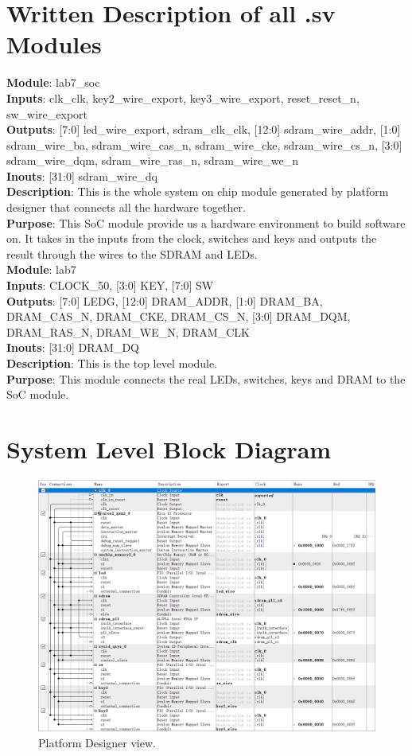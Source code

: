 \documentclass[12pt]{article}
\begin{document}
\section{Written Description of all .sv Modules}
\textbf{Module}: lab7\_soc \\ 
\textbf{Inputs}: clk\_clk, key2\_wire\_export, key3\_wire\_export, reset\_reset\_n, sw\_wire\_export \\ 
\textbf{Outputs}: [7:0] led\_wire\_export, sdram\_clk\_clk, [12:0] sdram\_wire\_addr, [1:0] sdram\_wire\_ba, sdram\_wire\_cas\_n, sdram\_wire\_cke, sdram\_wire\_cs\_n, [3:0] sdram\_wire\_dqm, sdram\_wire\_ras\_n, sdram\_wire\_we\_n \\ 
\textbf{Inouts}: [31:0] sdram\_wire\_dq \\
\textbf{Description}: This is the whole system on chip module generated by platform designer that connects all the hardware together. \\ 
\textbf{Purpose}: This SoC module provide us a hardware environment to build software on. It takes in the inputs from the clock, switches and keys and outputs the result through the wires to the SDRAM and LEDs. \\

\textbf{Module}: lab7 \\ 
\textbf{Inputs}: CLOCK\_50, [3:0] KEY, [7:0] SW \\ 
\textbf{Outputs}: [7:0] LEDG, [12:0] DRAM\_ADDR, [1:0] DRAM\_BA, DRAM\_CAS\_N, DRAM\_CKE, DRAM\_CS\_N, [3:0] DRAM\_DQM, DRAM\_RAS\_N, DRAM\_WE\_N, DRAM\_CLK \\ 
\textbf{Inouts}: [31:0] DRAM\_DQ \\
\textbf{Description}: This is the top level module. \\ 
\textbf{Purpose}: This module connects the real LEDs, switches, keys and DRAM to the SoC module.

\section{System Level Block Diagram}
\begin{figure}[H]
    \centering
    \includegraphics[width=15cm]{platform.png}
    \caption{Platform Designer view.}
\end{figure}
\end{document}
